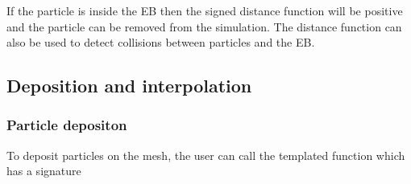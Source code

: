 \documentclass[letterpaper,10pt,english]{sphinxmanual}
\begin{document}
If the particle is inside the EB then the signed distance function will be positive and the particle can be removed from the simulation.
The distance function can also be used to detect collisions between particles and the EB.


\subsection{Deposition and interpolation}
\label{\detokenize{Source/Particles:deposition-and-interpolation}}

\subsubsection{Particle depositon}
\label{\detokenize{Source/Particles:particle-depositon}}
To deposit particles on the mesh, the user can call the templated function  which has a signature

\begin{sphinxVerbatim}[commandchars=\\\{\},formatcom=\scriptsize]
     
               
                                 
                          
                        
                               
                         
                                         
\end{sphinxVerbatim}
\end{document}
